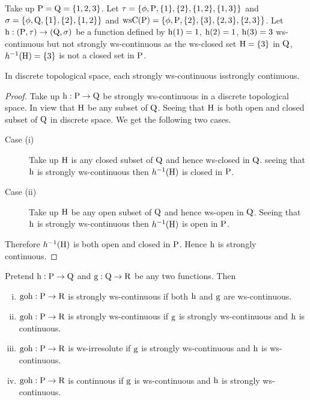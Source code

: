 \begin{exm}\label{exam3.3.18}
Take up $\mathrm{P}=\mathrm{Q}= \{1, 2, 3\}$. Let $\tau = \{\phi, \mathrm{P}, \{1\}, \{2\}, \{1, 2\}, \{1, 3\}\}$ and $\sigma = \{\phi, \mathrm{Q}, \{1\}, \{2\}, \{1,2\}\}$ and $\mathrm{ws}\mathrm{C}(\mathrm{P})= \{\phi, \mathrm{P}, \{2\}, \{3\}, \{2, 3\},\{2,3\}\}$. Let $\mathrm{h}: (\mathrm{P},\tau)\to (\mathrm{Q}, \sigma)$ be a function defined by $\mathrm{h}(1)=1$, $\mathrm{h}(2)=1$, $\mathrm{h}(3)=3$ ws-continuous but not strongly ws-continuous as the ws-closed set $\mathrm{H}= \{3\}$ in $\mathrm{Q}$, $h^{-1}(\mathrm{H})=\{3\}$ is not a closed set in $\mathrm{P}$.
\end{exm}

\begin{thm}\label{thm3.3.19}
In discrete topological space, each strongly ws-continuous is\break strongly continuous.
\end{thm}

\begin{proof}
Take up $\mathrm{h}: \mathrm{P}\to \mathrm{Q}$ be strongly ws-continuous in a discrete topological space. In view that $\mathrm{H}$ be any subset of $\mathrm{Q}$. Seeing that $\mathrm{H}$ is both open and closed subset of $\mathrm{Q}$ in discrete space. We get the following two cases.
\begin{description}
\item[Case (i)] Take up $\mathrm{H}$ is any closed subset of $\mathrm{Q}$ and hence ws-closed in $\mathrm{Q}$. seeing that $\mathrm{h}$ is strongly ws-continuous then $h^{-1}(\mathrm{H})$ is closed in $\mathrm{P}$.
\item[Case (ii)] Take up $\mathrm{H}$ be any open subset of $\mathrm{Q}$ and hence ws-open in $\mathrm{Q}$. Seeing that $\mathrm{h}$ is strongly ws-continuous then $h^{-1}(\mathrm{H})$ is open in $\mathrm{P}$.
\end{description}
Therefore $h^{-1}(\mathrm{H})$ is both open and closed in $\mathrm{P}$. Hence $\mathrm{h}$ is strongly continuous.
\end{proof}

\begin{thm}\label{thm3.3.20}
Pretend $\mathrm{h}: \mathrm{P}\to \mathrm{Q}$ and $\mathrm{g}: \mathrm{Q}\to \mathrm{R}$ be any two functions. Then
\begin{enumerate}[(i)]
\item $\text{goh}: \mathrm{P}\to \mathrm{R}$ is strongly ws-continuous if both $\mathrm{h}$ and $\mathrm{g}$ are ws-continuous.
\item $\text{goh}: \mathrm{P}\to \mathrm{R}$ is strongly ws-continuous if $\mathrm{g}$ is strongly ws-continuous and $\mathrm{h}$ is continuous.
\item $\text{goh}: \mathrm{P}\to \mathrm{R}$ is ws-irresolute if $\mathrm{g}$ is strongly ws-continuous and $\mathrm{h}$ is ws-continuous.
\item $\text{goh}: \mathrm{P}\to \mathrm{R}$ is continuous if $\mathrm{g}$ is ws-continuous and $\mathrm{h}$ is strongly ws-continuous.
\end{enumerate}
\end{thm}

